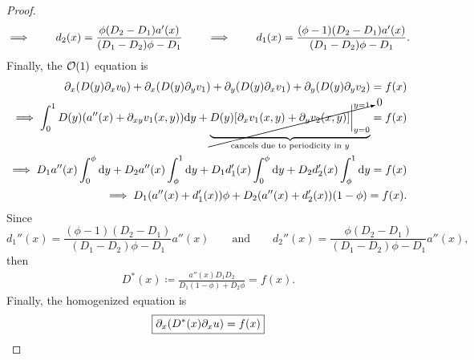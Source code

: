 \documentclass{article} %
\theoremstyle{plain}
\newcommand{\dy}{\partial_y}
\newcommand{\dxy}{\partial_{xy}}
\newcommand{\dx}{\partial_x}
\numberwithin{equation}{section} %
\numberwithin{figure}{section} %
\numberwithin{table}{section} %
\begin{document}
\begin{proof}
\begin{align*}
        \implies \qquad d_2(x) = \frac{\phi\qty(D_2 - D_1)a'(x)}{\qty(D_1 - D_2)\phi - D_1} \qquad \implies \qquad d_1(x) = \frac{\qty(\phi - 1) \qty(D_2 - D_1)a'(x)}{\qty(D_1 - D_2)\phi - D_1}.
    \end{align*}
    Finally, the $\order{1}$ equation is
    \begin{align*}
        \dx\qty(D(y)\dx v_0) + \dx\qty(D(y)\dy v_1) + \dy\qty(D(y) \dx v_1) + \dy\qty(D(y)\dy v_2) = f(x) \\
        \implies \int_0^1 D(y) \qty(a''(x) + \dxy v_1(x,y)) \dd y + \cancelto{0}{\underbrace{D(y)\qty[\dx v_1(x,y) + \dy v_2(x,y)]\bigg|_{y=0}^{y=1}}_{\text{cancels due to periodicity in $y$}}} = f(x) \\
        \implies D_1 a''(x)\int_0^\phi \dd y + D_2 a''(x)\int_\phi^1 \dd y + D_1d_1'(x)\int_0^\phi \dd y + D_2d_2'(x)\int_\phi^1 \dd y = f(x) \\
        \implies D_1\qty(a''(x) + d_1'(x))\phi + D_2\qty(a''(x) + d_2'(x))(1 - \phi) = f(x).
    \end{align*}
    Since $$d_1''(x) = \frac{(\phi - 1)(D_2 - D_1)}{(D_1 - D_2)\phi - D_1}a''(x) \qquad \text{and} \qquad d_2''(x) = \frac{\phi(D_2 - D_1)}{(D_1 - D_2)\phi - D_1}a''(x),$$
    then
    \begin{align*}
        D^*(x) \coloneqq \frac{a''(x)D_1D_2}{D_1(1 - \phi) + D_2\phi} = f(x).
    \end{align*}
    Finally, the homogenized equation is
    \begin{align*}
        \boxed{\dx\qty(D^*(x)\dx u) = f(x)}
    \end{align*}
\end{proof}
\end{document}
